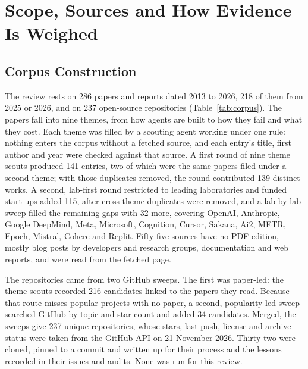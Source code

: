 \section{Scope, Sources and How Evidence Is Weighed}\label{sec:scope}

\subsection{Corpus Construction}

The review rests on 286 papers and reports dated 2013 to 2026, 218 of them from 2025 or 2026, and on 237 open-source repositories (Table~\ref{tab:corpus}). The papers fall into nine themes, from how agents are built to how they fail and what they cost. Each theme was filled by a scouting agent working under one rule: nothing enters the corpus without a fetched source, and each entry's title, first author and year were checked against that source. A first round of nine theme scouts produced 141 entries, two of which were the same papers filed under a second theme; with those duplicates removed, the round contributed 139 distinct works. A second, lab-first round restricted to leading laboratories and funded start-ups added 115, after cross-theme duplicates were removed, and a lab-by-lab sweep filled the remaining gaps with 32 more, covering OpenAI, Anthropic, Google DeepMind, Meta, Microsoft, Cognition, Cursor, Sakana, Ai2, METR, Epoch, Mistral, Cohere and Replit. Fifty-five sources have no PDF edition, mostly blog posts by developers and research groups, documentation and web reports, and were read from the fetched page.

The repositories came from two GitHub sweeps. The first was paper-led: the theme scouts recorded 216 candidates linked to the papers they read. Because that route misses popular projects with no paper, a second, popularity-led sweep searched GitHub by topic and star count and added 34 candidates. Merged, the sweeps give 237 unique repositories, whose stars, last push, license and archive status were taken from the GitHub API on 21 November 2026. Thirty-two were cloned, pinned to a commit and written up for their process and the lessons recorded in their issues and audits. None was run for this review.

